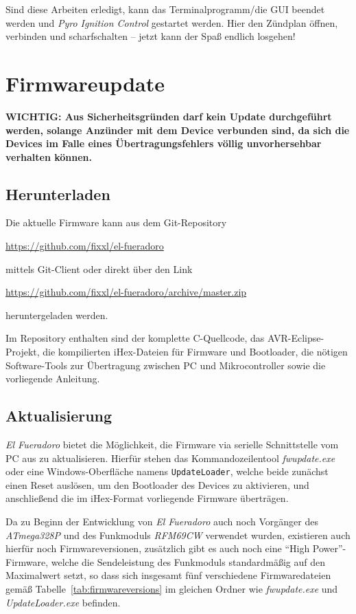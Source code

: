 \documentclass[pdftex, parskip, numbers=noenddot, toc=listof]{scrbook}
\newcommand{\pic}{\emph{Pyro Ignition Control}}
\newcommand{\anlage}{\emph{El Fueradoro}}
\begin{document}
			Sind diese Arbeiten erledigt, kann das Terminalprogramm/die GUI beendet werden und {\pic} gestartet werden. Hier den Zündplan öffnen, verbinden und scharfschalten -- jetzt kann der Spaß endlich losgehen!

	\chapter{Firmwareupdate}
		\label{ch:firmwareupdate}

		\textbf{WICHTIG: Aus Sicherheitsgründen darf kein Update durchgeführt werden, solange Anzünder mit dem Device verbunden sind, da sich die Devices im Falle eines Übertragungsfehlers völlig unvorhersehbar verhalten können.}

		\section{Herunterladen}

			Die aktuelle Firmware kann aus dem Git-Repository
			\begin{center}\url{https://github.com/fixxl/el-fueradoro}\end{center}
			mittels Git-Client oder direkt über den Link
			\begin{center}\url{https://github.com/fixxl/el-fueradoro/archive/master.zip}\end{center}
			heruntergeladen werden.

			Im Repository enthalten sind der komplette C-Quellcode, das AVR-Eclipse-Projekt, die kom\-pilierten iHex-Dateien für Firmware und Bootloader, die nötigen Software-Tools zur Übertragung zwischen PC und Mikrocontroller sowie die vorliegende Anleitung.

		\section{Aktualisierung}

			{\anlage} bietet die Möglichkeit, die Firmware via serielle Schnittstelle vom PC aus zu aktualisieren. Hierfür stehen das Kommandozeilentool \emph{fwupdate.exe} oder eine Windows-Oberfläche namens \texttt{UpdateLoader}, welche beide zunächst einen Reset auslösen, um den Bootloader des Devices zu aktivieren, und anschließend die im iHex-Format vorliegende Firmware überträgen.

			Da zu Beginn der Entwicklung von {\anlage} auch noch Vorgänger des \emph{ATmega328P} und des Funkmoduls \emph{RFM69CW} verwendet wurden, existieren auch hierfür noch Firmwareversionen, zusätzlich gibt es auch noch eine \enquote{High Power}-Firmware, welche die Sendeleistung des Funkmoduls standardmäßig auf den Maximalwert setzt, so dass sich insgesamt fünf verschiedene Firmwaredateien gemäß Tabelle~\ref{tab:firmwareversions} im gleichen Ordner wie \emph{fwupdate.exe} und \emph{UpdateLoader.exe} befinden.
\end{document}
